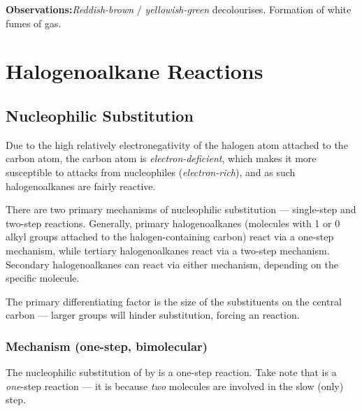 			\vbox{\textbf{Observations:}\tabto{35mm}\textit{\color{Mahogany}Reddish-brown}  /
										\textit{\color{YellowGreen}yellowish-green}  decolourises.
										\tabto{35mm}Formation of white fumes of  gas.}


	\pagebreak
	\section{Halogenoalkane Reactions}

		\subsection{Nucleophilic Substitution}

			Due to the high relatively electronegativity of the halogen atom attached to the carbon atom, the carbon atom is
			\textit{electron-deficient}, which makes it more susceptible to attacks from nucleophiles (\textit{electron-rich}), and
			as such halogenoalkanes are fairly reactive.

			There are two primary mechanisms of nucleophilic substitution –– single-step and two-step reactions. Generally, primary
			halogenoalkanes (molecules with 1 or 0 alkyl groups attached to the halogen-containing carbon) react via a one-step
			mechanism, while tertiary halogenoalkanes react via a two-step mechanism. Secondary halogenoalkanes can react via either
			mechanism, depending on the specific molecule.

			The primary differentiating factor is the size of the substituents on the central carbon –– larger groups will hinder
			\sntwo substitution, forcing an \snone reaction.


			\subsubsection{\sntwo Mechanism (one-step, bimolecular)}

				The nucleophilic substitution of  by  is a one-step reaction. Take note that \sntwo is a
				\textit{one}-step reaction –– it is \sntwo because \textit{two} molecules are involved in the slow (only) step.


